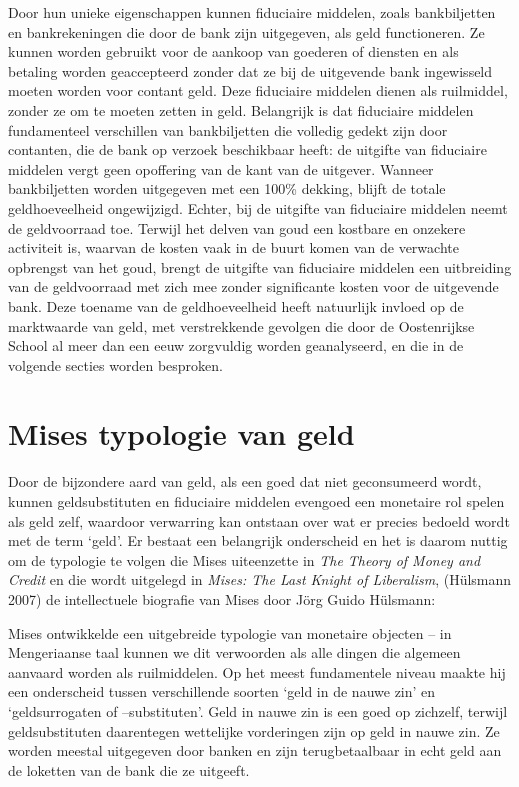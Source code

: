 \documentclass[
  a5paper,
  smalldemyvopaper,11pt,twoside,onecolumn,openright,extrafontsizes,
hidelinks]{memoir}
\begin{document}
Door hun unieke eigenschappen kunnen fiduciaire middelen, zoals
bankbiljetten en bankrekeningen die door de bank zijn uitgegeven, als
geld functioneren. Ze kunnen worden gebruikt voor de aankoop van
goederen of diensten en als betaling worden geaccepteerd zonder dat ze
bij de uitgevende bank ingewisseld moeten worden voor contant geld. Deze
fiduciaire middelen dienen als ruilmiddel, zonder ze om te moeten zetten
in geld. Belangrijk is dat fiduciaire middelen fundamenteel verschillen
van bankbiljetten die volledig gedekt zijn door contanten, die de bank
op verzoek beschikbaar heeft: de uitgifte van fiduciaire middelen vergt
geen opoffering van de kant van de uitgever. Wanneer bankbiljetten
worden uitgegeven met een 100\% dekking, blijft de totale
geldhoeveelheid ongewijzigd. Echter, bij de uitgifte van fiduciaire
middelen neemt de geldvoorraad toe. Terwijl het delven van goud een
kostbare en onzekere activiteit is, waarvan de kosten vaak in de buurt
komen van de verwachte opbrengst van het goud, brengt de uitgifte van
fiduciaire middelen een uitbreiding van de geldvoorraad met zich mee
zonder significante kosten voor de uitgevende bank. Deze toename van de
geldhoeveelheid heeft natuurlijk invloed op de marktwaarde van geld, met
verstrekkende gevolgen die door de Oostenrijkse School al meer dan een
eeuw zorgvuldig worden geanalyseerd, en die in de volgende secties
worden besproken.

\section{Mises typologie van geld}\label{mises-typologie-van-geld}

Door de bijzondere aard van geld, als een goed dat niet geconsumeerd
wordt, kunnen geldsubstituten en fiduciaire middelen evengoed een
monetaire rol spelen als geld zelf, waardoor verwarring kan ontstaan
over wat er precies bedoeld wordt met de term `geld'. Er bestaat een
belangrijk onderscheid en het is daarom nuttig om de typologie te volgen
die Mises uiteenzette in \emph{The Theory of Money and Credit} en die
wordt uitgelegd in \emph{Mises: The Last Knight of Liberalism},
(Hülsmann 2007) de intellectuele biografie van Mises door Jörg Guido
Hülsmann:

Mises ontwikkelde een uitgebreide typologie van monetaire objecten -- in
Mengeriaanse taal kunnen we dit verwoorden als alle dingen die algemeen
aanvaard worden als ruilmiddelen. Op het meest fundamentele niveau
maakte hij een onderscheid tussen verschillende soorten `geld in de
nauwe zin' en `geldsurrogaten of --substituten'. Geld in nauwe zin is
een goed op zichzelf, terwijl geldsubstituten daarentegen wettelijke
vorderingen zijn op geld in nauwe zin. Ze worden meestal uitgegeven door
banken en zijn terugbetaalbaar in echt geld aan de loketten van de bank
die ze uitgeeft.
\end{document}
